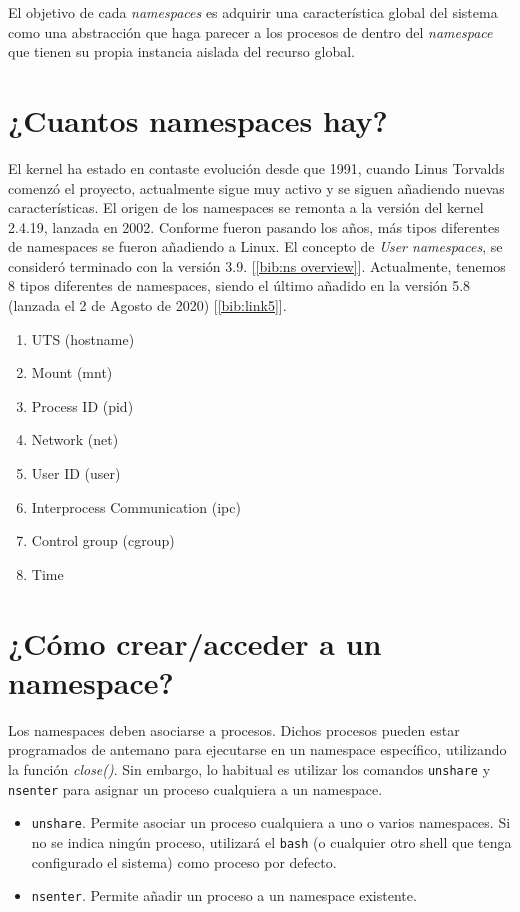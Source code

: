 \documentclass[a4paper, oneside, 12pt]{book}
\begin{document}
	\par \noindent El objetivo de cada \textit{namespaces} es adquirir una característica global del sistema como una abstracción que haga parecer a los procesos de dentro del \textit{namespace} que tienen su propia instancia aislada del recurso global.
	
	\section{¿Cuantos namespaces hay?}
	\par\noindent El kernel ha estado en contaste evolución desde que 1991, cuando Linus Torvalds comenzó el proyecto, actualmente sigue muy activo y se siguen añadiendo nuevas características. El origen de los namespaces se remonta a la versión del kernel 2.4.19, lanzada en 2002. Conforme fueron pasando los años, más tipos diferentes de namespaces se fueron añadiendo a Linux. El concepto de \textit{User namespaces}, se consideró terminado con la versión 3.9. [\ref{bib:ns overview}]. Actualmente, tenemos 8 tipos diferentes de namespaces, siendo el último añadido en la versión 5.8 (lanzada el 2 de Agosto de 2020) [\ref{bib:link5}]. 
	
	\begin{enumerate}
		\item UTS (hostname)
		\item Mount (mnt)
		\item Process ID (pid)
		\item Network (net)
		\item User ID (user) 
		\item Interprocess Communication (ipc)
		\item Control group (cgroup)
		\item Time
	\end{enumerate}
	
	
	\section{¿Cómo crear/acceder a un namespace?}
	
	\noindent Los namespaces deben asociarse a procesos. Dichos procesos pueden estar programados de antemano para ejecutarse en un namespace específico, utilizando la función \textit{close()}. Sin embargo, lo habitual es utilizar los comandos \texttt{unshare} y \texttt{nsenter} para asignar un proceso cualquiera a un namespace.
	
	\begin{itemize}
		\item \texttt{unshare}. Permite asociar un proceso cualquiera a uno o varios namespaces. Si no se indica ningún proceso, utilizará el \texttt{bash} (o cualquier otro shell que tenga configurado el sistema) como proceso por defecto.
		
		\item \texttt{nsenter}. Permite añadir un proceso a un namespace existente.	
	\end{itemize}
	
\end{document}
